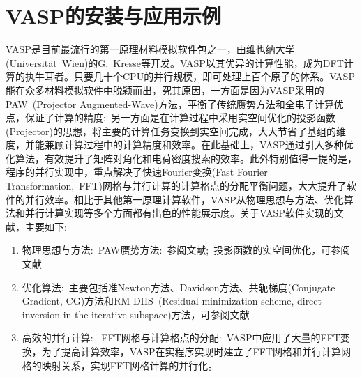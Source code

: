 \chapter{VASP的安装与应用示例}\label{chap:VASP_train}
\textrm{VASP}是目前最流行的第一原理材料模拟软件包之一，由维也纳大学\textrm{(Universit\"at~Wien)}的\textrm{G.~Kresse}等开发。\cite{VASP_manual}\textrm{VASP}以其优异的计算性能，成为\textrm{DFT}计算的执牛耳者。\cite{CPC177-6_2007}只要几十个\textrm{CPU}的并行规模，即可处理上百个原子的体系。\textrm{VASP}能在众多材料模拟软件中脱颖而出，究其原因，一方面是因为\textrm{VASP}采用的\textrm{PAW~(Projector Augmented-Wave)}方法\cite{PRB50-17953_1994,PRB59-1758_1999}，平衡了传统赝势方法和全电子计算优点，保证了计算的精度;~另一方面是在计算过程中采用实空间优化的投影函数\textrm{(Projector)}的思想，将主要的计算任务变换到实空间完成，大大节省了基组的维度，并能兼顾计算过程中的计算精度和效率。在此基础上，\textrm{VASP}通过引入多种优化算法，有效提升了矩阵对角化和电荷密度搜索的效率。此外特别值得一提的是，程序的并行实现中，重点解决了快速\textrm{Fourier}变换\textrm{(Fast Fourier Transformation,~FFT)}网格与并行计算的计算格点的分配平衡问题，大大提升了软件的并行效率。相比于其他第一原理计算软件，\textrm{VASP}从物理思想与方法、优化算法和并行计算实现等多个方面都有出色的性能展示度。关于\textrm{VASP}软件实现的文献，主要如下:~
\begin{enumerate}
	\item 物理思想与方法:~\textrm{PAW}赝势方法:~参阅文献;~投影函数的实空间优化，可参阅文献
	\item 优化算法:~主要包括准\textrm{Newton}方法、\textrm{Davidson}方法、共轭梯度(\textrm{Conjugate Gradient, CG})方法和\textrm{RM-DIIS~(Residual minimization scheme, direct inversion in the iterative subspace)}方法，可参阅文献
	\item 高效的并行计算:~ \textrm{FFT}网格与计算格点的分配:~\textrm{VASP}中应用了大量的\textrm{FFT}变换，为了提高计算效率，\textrm{VASP}在实程序实现时建立了\textrm{FFT}网格和并行计算网格的映射关系，实现\textrm{FFT}网格计算的并行化。 %
\end{enumerate}

